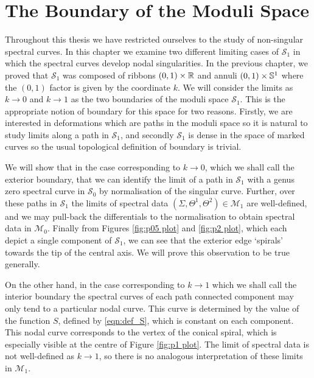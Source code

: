 
\chapter{The Boundary of the Moduli Space}
\label{chp:Moduli Boundary}

Throughout this thesis we have restricted ourselves to the study of non-singular spectral curves. In this chapter we examine two different limiting cases of $\mathcal{S}_1$ in which the spectral curves develop nodal singularities.
In the previous chapter, we proved that $\mathcal{S}_1$ was composed of ribbons $(0,1)\times \R$ and annuli $(0,1) \times \S^1$ where the $(0,1)$ factor is given by the coordinate $k$. We will consider the limits as $k \to 0$ and $k \to 1$ as the two boundaries of the moduli space $\mathcal{S}_1$. This is the appropriate notion of boundary for this space for two reasons. Firstly, we are interested in deformations which are paths in the moduli space so it is natural to study limits along a path in $\mathcal{S}_1$, and secondly $\mathcal{S}_1$ is dense in the space of marked curves so the usual topological definition of boundary is trivial.

We will show that in the case corresponding to $k \to 0$, which we shall call the exterior boundary, that we can identify the limit of a path in $\mathcal{S}_1$ with a genus zero spectral curve in $\mathcal{S}_0$ by normalisation of the singular curve. Further, over these paths in $\mathcal{S}_1$ the limits of spectral data $(Σ,Θ^1,Θ^2) \in \mathcal{M}_1$ are well-defined, and we may pull-back the differentials to the normalisation to obtain spectral data in $\mathcal{M}_0$. Finally from Figures \ref{fig:p05 plot} and \ref{fig:p2 plot}, which each depict a single component of $\mathcal{S}_1$, we can see that the exterior edge `spirals' towards the tip of the central axis. We will prove this observation to be true generally.

On the other hand, in the case corresponding to $k \to 1$ which we shall call the interior boundary the spectral curves of each path connected component may only tend to a particular nodal curve. This curve is determined by the value of the function $S$, defined by \eqref{eqn:def_S}, which is constant on each component. This nodal curve corresponds to the vertex of the conical spiral, which is especially visible at the centre of Figure \ref{fig:p1 plot}. The limit of spectral data is not well-defined as $k \to 1$, so there is no analogous interpretation of these limits in $\mathcal{M}_1$.

